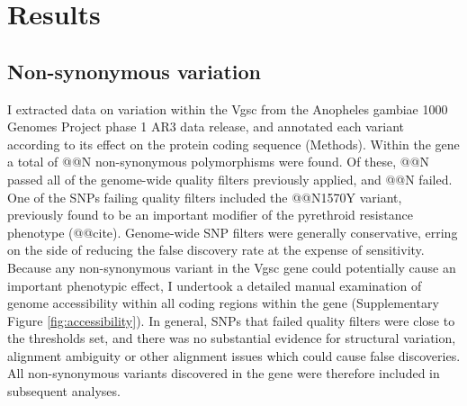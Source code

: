 \documentclass[a4paper,11pt,abstracton,hidelinks]{scrartcl}
\begin{document}
\section*{Results}


\subsection*{Non-synonymous variation}


%
I extracted data on variation within the Vgsc from the Anopheles gambiae 1000 Genomes Project phase 1 AR3 data release, and annotated each variant according to its effect on the protein coding sequence (Methods).
%
Within the gene a total of @@N non-synonymous polymorphisms were found.
%
Of these, @@N passed all of the genome-wide quality filters previously applied, and @@N failed.
%
One of the SNPs failing quality filters included the @@N1570Y variant, previously found to be an important modifier of the pyrethroid resistance phenotype (@@cite).
%
Genome-wide SNP filters were generally conservative, erring on the side of reducing the false discovery rate at the expense of sensitivity.
%
Because any non-synonymous variant in the Vgsc gene could potentially cause an important phenotypic effect, I undertook a detailed manual examination of genome accessibility within all coding regions within the gene (Supplementary Figure \ref{fig:accessibility}).
%
In general, SNPs that failed quality filters were close to the thresholds set, and there was no substantial evidence for structural variation, alignment ambiguity or other alignment issues which could cause false discoveries.
%
All non-synonymous variants discovered in the gene were therefore included in subsequent analyses.
\end{document}

